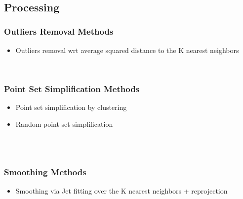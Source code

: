   \\
  \\
  \\


\subsection{Processing}

\subsubsection{Outliers Removal Methods}

\begin{itemize}
\item Outliers removal wrt average squared distance to the K nearest neighbors
\end{itemize}

  \\


\subsubsection{Point Set Simplification Methods}

\begin{itemize}
\item Point set simplification by clustering
\item Random point set simplification
\end{itemize}

  \\
  \\


\subsubsection{Smoothing Methods}

\begin{itemize}
\item Smoothing via Jet fitting over the K nearest neighbors + reprojection
\end{itemize}

  \\


